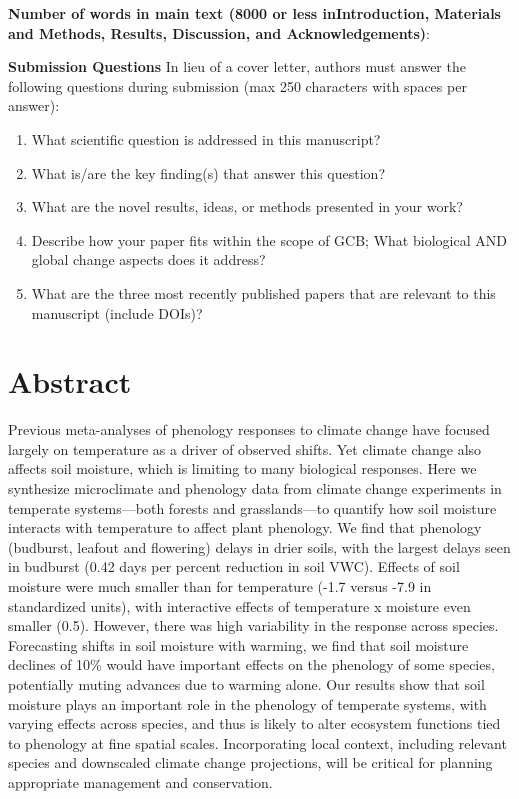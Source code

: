 \documentclass{article}
\begin{document}
\textbf{Number of words in main text (8000 or less inIntroduction, Materials and Methods, Results, Discussion, and Acknowledgements)}: 


\textbf{Submission Questions} In lieu of a cover letter, authors must answer the following questions during submission (max 250 characters with spaces per answer):
\begin{enumerate}
\item What scientific question is addressed in this manuscript?
\item What is/are the key finding(s) that answer this question?
\item What are the novel results, ideas, or methods presented in your work?
\item Describe how your paper fits within the scope of GCB; What biological AND global change aspects does it address?
\item What are the three most recently published papers that are relevant to this manuscript (include DOIs)?
\end{enumerate}



\linenumbers

\section*{Abstract} 
Previous meta-analyses of phenology responses to climate change have focused largely on temperature as a driver of observed shifts. Yet climate change also affects soil moisture, which is limiting to many biological responses. Here we synthesize microclimate and phenology data from climate change experiments in temperate systems---both forests and grasslands---to quantify how soil moisture interacts with temperature to affect plant phenology. 
We find that phenology (budburst, leafout and flowering) delays in drier soils, with the largest delays seen in budburst (0.42 days per percent reduction in soil VWC). Effects of soil moisture were much smaller than for temperature (-1.7 versus -7.9 in standardized units), with interactive effects of temperature x moisture even smaller (0.5). However, there was high variability in the response across species. Forecasting shifts in soil moisture with warming, we find that soil moisture declines of 10\% would have important effects on the phenology of some species, potentially muting advances due to warming alone. Our results show that soil moisture plays an important role in the phenology of temperate systems, with varying effects across species, and thus is likely to alter ecosystem functions tied to phenology at fine spatial scales. Incorporating local context, including relevant species and downscaled climate change projections, will be critical for planning appropriate management and conservation.
\end{document}
